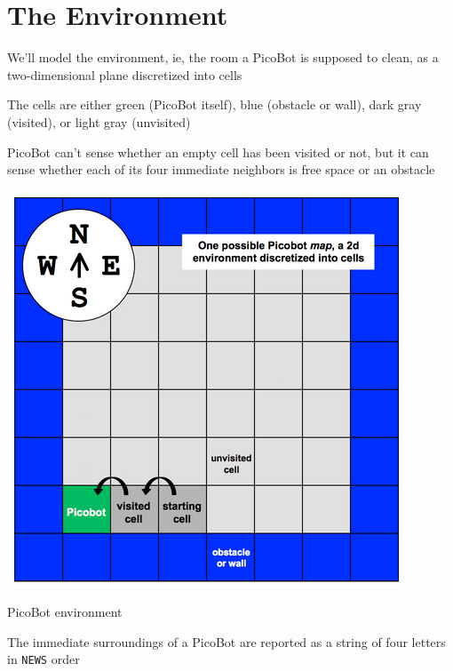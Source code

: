 \documentclass[8pt,a4paper,compress]{beamer}
\begin{document}
\section{The Environment}
\begin{frame}[fragile]
\begin{minipage}{200pt}
\pause
We'll model the environment, ie, the room a PicoBot is supposed to clean, as a two-dimensional plane discretized into cells

\pause
\bigskip

The cells are either green (PicoBot itself), blue (obstacle or wall), dark gray (visited), or light gray (unvisited)

\pause
\bigskip

PicoBot can't sense whether an empty cell has been visited or not, but it can sense whether each of its four immediate neighbors is free space or an obstacle
\end{minipage}\hfill%
\begin{minipage}{100pt}
\begin{center}
\includegraphics[scale=0.25]{figures/picobot_env.png}

\smallskip

\tiny PicoBot environment
\end{center}
\end{minipage}

\smallskip

\begin{minipage}{200pt}
\pause
The immediate surroundings of a PicoBot are reported as a string of four letters in \lstinline{NEWS} order


\end{minipage}
\end{frame}
\end{document}
